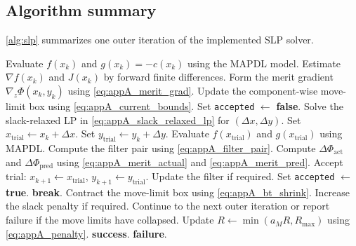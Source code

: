 \documentclass[11pt,a4paper]{article}
\begin{document}
\subsection{Algorithm summary}
\label{sec:slpA:algo}

\autoref{alg:slp} summarizes one outer iteration of the implemented
SLP solver.

\begin{algorithm}[h]
\caption{One outer iteration of the implemented SLP solver.}
\label{alg:slp}
\begin{algorithmic}[1]
\State Evaluate $f(x_k)$ and $g(x_k)=-c(x_k)$ using the MAPDL model.
\State Estimate $\nabla f(x_k)$ and $J(x_k)$ by forward finite differences.
\State Form the merit gradient $\nabla_z\Phi(x_k,y_k)$ using \autoref{eq:appA_merit_grad}.
\State Update the component-wise move-limit box using \autoref{eq:appA_current_bounds}.
\State Set \texttt{accepted} $\gets$ \textbf{false}.
    \State Solve the slack-relaxed LP in \autoref{eq:appA_slack_relaxed_lp} for $(\Delta x,\Delta y)$.
    \State Set $x_{\mathrm{trial}} \gets x_k+\Delta x$.
    \State Set $y_{\mathrm{trial}} \gets y_k+\Delta y$.
    \State Evaluate $f(x_{\mathrm{trial}})$ and $g(x_{\mathrm{trial}})$ using MAPDL.
    \State Compute the filter pair using \autoref{eq:appA_filter_pair}.
    \State Compute $\Delta\Phi_{\mathrm{act}}$ and $\Delta\Phi_{\mathrm{pred}}$ using \autoref{eq:appA_merit_actual} and \autoref{eq:appA_merit_pred}.
        \State Accept trial:
        $x_{k+1}\gets x_{\mathrm{trial}}$,
        $y_{k+1}\gets y_{\mathrm{trial}}$.
        \State Update the filter if required.
        \State Set \texttt{accepted} $\gets$ \textbf{true}.
        \State \textbf{break}.
    \Else
        \State Contract the move-limit box using \autoref{eq:appA_bt_shrink}.
    \EndIf
\EndFor
{}
    \State Increase the slack penalty if required.
    \State Continue to the next outer iteration or report failure if the move limits have collapsed.
\EndIf
{}
    \State Update $R \gets \min(a_MR,R_{\max})$ using \autoref{eq:appA_penalty}.
\EndIf
{}
    \State \Return \textbf{success}.
\EndIf
{}
    \State \Return \textbf{failure}.
\EndIf
\end{algorithmic}
\end{algorithm}
\end{document}
